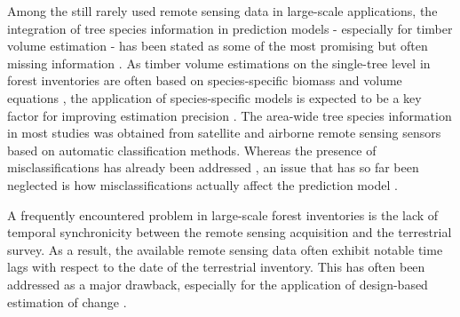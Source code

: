 Among the still rarely used remote sensing data in large-scale applications, the integration of tree species information in prediction models - especially for timber volume estimation - has been stated as some of the most promising but often missing information \citep{koch2010, white2016}. As timber volume estimations on the single-tree level in forest inventories are often based on species-specific biomass and volume equations \citep{husmann2017,zianis2005}, the application of species-specific models is expected to be a key factor for improving estimation precision \citep{white2016}.  The area-wide tree species information in most studies was obtained from satellite and airborne remote sensing sensors based on automatic classification methods. Whereas the presence of misclassifications has already been addressed \citep{latifi2012}, an issue that has so far been neglected is how misclassifications actually affect the prediction model \citep{gustafson2003}.\par

A frequently encountered problem in large-scale forest inventories is the lack of temporal synchronicity between the remote sensing acquisition and the terrestrial survey. As a result, the available remote sensing data often exhibit notable time lags with respect to the date of the terrestrial inventory. This has often been addressed as a major drawback, especially for the application of design-based estimation of change \citep{massey2015b}.\par

